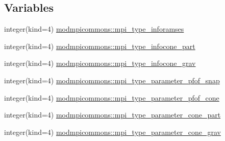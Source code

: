 \subsection*{Variables}
\begin{DoxyCompactItemize}
\item 
integer(kind=4) \hyperlink{namespacemodmpicommons_a7209ec50a2345627928ec7f683f09392}{modmpicommons\+::mpi\+\_\+type\+\_\+inforamses}
\item 
integer(kind=4) \hyperlink{namespacemodmpicommons_a47d1927be23cfeeb8ca1750bfc8667ca}{modmpicommons\+::mpi\+\_\+type\+\_\+infocone\+\_\+part}
\item 
integer(kind=4) \hyperlink{namespacemodmpicommons_afa04cc242f5aeb82cc0dea5a175ec366}{modmpicommons\+::mpi\+\_\+type\+\_\+infocone\+\_\+grav}
\item 
integer(kind=4) \hyperlink{namespacemodmpicommons_a330add7c6795d1bcbf3b4679fbe28db5}{modmpicommons\+::mpi\+\_\+type\+\_\+parameter\+\_\+pfof\+\_\+snap}
\item 
integer(kind=4) \hyperlink{namespacemodmpicommons_a5fc1e7c8e04f9a9c5f7e0e07a5141c8d}{modmpicommons\+::mpi\+\_\+type\+\_\+parameter\+\_\+pfof\+\_\+cone}
\item 
integer(kind=4) \hyperlink{namespacemodmpicommons_a0aa6354f5e5b7ccf30b1a8039a39fbef}{modmpicommons\+::mpi\+\_\+type\+\_\+parameter\+\_\+cone\+\_\+part}
\item 
integer(kind=4) \hyperlink{namespacemodmpicommons_ab28bb5018211e0f3fef44b29db2e6b13}{modmpicommons\+::mpi\+\_\+type\+\_\+parameter\+\_\+cone\+\_\+grav}
\end{DoxyCompactItemize}
